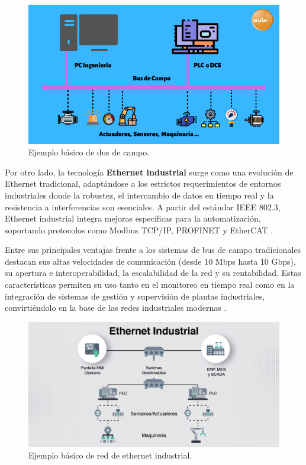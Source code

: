 \begin{figure} [h!]
  \begin{center}
    \includegraphics[width=12cm]{figs/bus_de_campo}
  \end{center}
  \caption{\centering Ejemplo básico de dus de campo. \cite{info_bus}}
  \label{fig:bus_de_campo}
\end{figure} 

Por otro lado, la tecnología \textbf{Ethernet industrial} surge como una evolución de Ethernet tradicional, adaptándose a los estrictos requerimientos de entornos industriales donde la robustez, el intercambio de datos en tiempo real y la resistencia a interferencias son esenciales. A partir del estándar IEEE 802.3, Ethernet industrial integra mejoras específicas para la automatización, soportando protocolos como Modbus TCP/IP, PROFINET y EtherCAT \cite{bus_vs_ethernet}.

Entre sus principales ventajas frente a los sistemas de bus de campo tradicionales destacan sus altas velocidades de comunicación (desde 10 Mbps hasta 10 Gbps), su apertura e interoperabilidad, la escalabilidad de la red y su rentabilidad. Estas características permiten su uso tanto en el monitoreo en tiempo real como en la integración de sistemas de gestión y supervisión de plantas industriales, convirtiéndolo en la base de las redes industriales modernas \cite{bus_vs_ethernet}.

\begin{figure} [h!]
  \begin{center}
    \includegraphics[width=12cm]{figs/ethernet_industrial}
  \end{center}
  \caption{\centering Ejemplo básico de red de ethernet industrial. \cite{ethernet_imagen}}
  \label{fig:ethernet_industrial}
\end{figure} 


